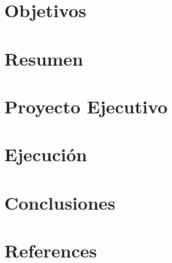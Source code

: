 \documentclass[12pt,a4paper,spanish]{article}
\begin{document}
    
    
    \glsaddall
    \printnoidxglossary[style=tree,title=Glosario,nonumberlist]\label{sec:glossary}

    \newpage
    \section{Objetivos}\label{sec:objetivos}
    

    \newpage
    \section{Resumen}\label{sec:resumen}
    

    \newpage
    \section{Proyecto Ejecutivo}\label{sec:proyecto_ejecutivo}
    

    \newpage
    \section{Ejecución}\label{sec:ejecucion}
    

    \newpage
    \section{Conclusiones}\label{sec:conclusiones}
    

    \newpage
    \section{References}\label{sec:references}
    
    
\end{document}
